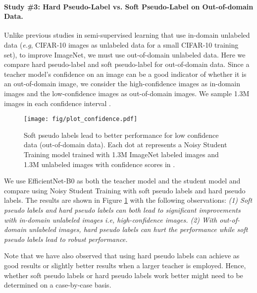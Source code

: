 \documentclass[10pt,twocolumn,letterpaper]{article}
\def\ie{\emph{i.e}\onedot}
\def\eg{\emph{e.g}\onedot}
\begin{document}
\paragraph{Study \#3: Hard Pseudo-Label vs. Soft Pseudo-Label on Out-of-domain Data.}

 
Unlike previous studies in semi-supervised learning that use in-domain unlabeled data (\eg, CIFAR-10 images as unlabeled data for a small CIFAR-10 training set), to improve ImageNet, we must use  out-of-domain unlabeled data. 
Here we compare hard pseudo-label and soft pseudo-label for out-of-domain data. 
Since a teacher model's confidence on an image can be a good indicator of whether it is an out-of-domain image, we consider the high-confidence images as in-domain images and the low-confidence images as out-of-domain images. We sample 1.3M images in each confidence interval .


 \begin{figure}[h!]
    \centering     
    \texttt{[image: fig/plot\_confidence.pdf]}     
    \caption{Soft pseudo labels lead to better performance for low confidence data (out-of-domain data). Each dot at  represents a Noisy Student Training model trained with 1.3M ImageNet labeled images and 1.3M unlabeled images with confidence scores in .}  
    \label{fig:soft_vs_hard_vary_confidence} 
 \end{figure}
We use EfficientNet-B0 as both the teacher model and the student model and compare using Noisy Student Training with soft pseudo labels and hard pseudo labels. 
The results are shown in Figure  \ref{fig:soft_vs_hard_vary_confidence} with the following observations: \emph{(1) Soft pseudo labels and hard pseudo labels can both lead to significant improvements with in-domain unlabeled images \ie, high-confidence images. (2) With out-of-domain unlabeled images, hard pseudo labels can hurt the performance while soft pseudo labels lead to robust performance.}



Note that we have also observed that using hard pseudo labels can achieve as good results or slightly better results when a larger teacher is employed. Hence, whether soft pseudo labels or hard pseudo labels work better might need to be determined on a case-by-case basis. 
\end{document}
